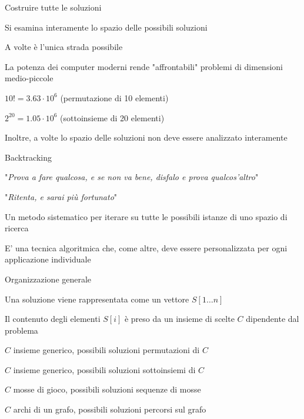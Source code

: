 \begin{frame}{Costruire tutte le soluzioni}


\medskip
\BIL
\item Si esamina interamente lo spazio delle possibili soluzioni
\item A volte è l'unica strada possibile
\item La potenza dei computer moderni rende "affrontabili" problemi di dimensioni medio-piccole
\BI
\item $10!	= 3.63 \cdot 10^6$	(permutazione di 10 elementi)
\item $2^{20} = 1.05 \cdot 10^6$ (sottoinsieme di 20 elementi)
\EI
\item  Inoltre, a volte lo spazio delle soluzioni non deve essere analizzato 
interamente
\EIL
\end{frame}

\begin{frame}{Backtracking}

\BIL
\item  "\emph{Prova a fare qualcosa, e se non va bene, disfalo e prova qualcos'altro}"
\item "\emph{Ritenta, e sarai più fortunato}"
\EIL

\medskip
{}
\BI
\item Un metodo sistematico per iterare su tutte le possibili istanze di uno spazio di ricerca
\item E' una tecnica algoritmica che, come altre, deve essere personalizzata per ogni applicazione individuale
\EI

\end{frame}


\begin{frame}{Organizzazione generale}
\BI
\item Una soluzione viene rappresentata come un \alert{vettore $S[1 \ldots n]$} 
\item  Il contenuto degli elementi $S[i]$ è preso da un \alert{insieme di scelte $C$} dipendente dal problema
\EI

\medskip
{}
\BI
\item $C$ insieme generico, possibili soluzioni \alert{permutazioni} di $C$
\item $C$ insieme generico, possibili soluzioni \alert{sottoinsiemi} di $C$
\item $C$ mosse di gioco, possibili soluzioni \alert{sequenze di mosse}
\item $C$ archi di un grafo, possibili soluzioni \alert{percorsi sul grafo}
\EI
\end{frame}

